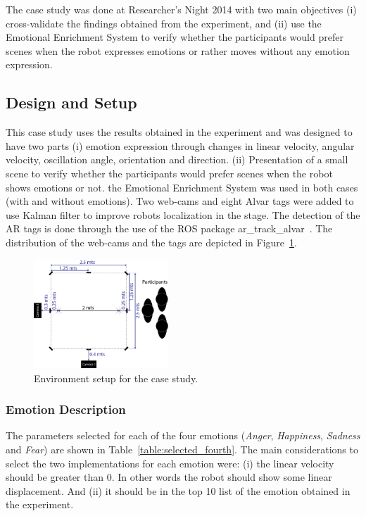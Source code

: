 The case study was done at Researcher's Night 2014 with two main objectives (i) cross-validate the findings obtained from the experiment, and (ii) use the Emotional Enrichment System to verify whether the participants would prefer scenes when the robot expresses emotions or rather moves without any emotion expression.

\subsection{Design and Setup}

This case study uses the results obtained in the experiment and was designed to have two parts (i) emotion expression through changes in linear velocity, angular velocity, oscillation angle, orientation and direction. 
(ii) Presentation of a small scene to verify whether the participants would prefer scenes when the robot shows emotions or not. the Emotional Enrichment System was used in both cases (with and without emotions). Two web-cams and eight Alvar tags were added to use Kalman filter to improve robots localization in the stage. The detection of the AR tags is done through the use of the ROS package ar\_track\_alvar~\cite{artag2015}. The distribution of the web-cams and the tags are depicted in Figure~\ref{fig:setup_fourth}. 

\begin{figure}
	\centering
	\includegraphics[width=0.45\textwidth]{./Images/FourthCase.png} 
	\caption{Environment setup for the case study.}
	\label{fig:setup_fourth}
\end{figure}

\subsubsection{Emotion Description}

The parameters selected for each of the four emotions (\textit{Anger}, \textit{Happiness}, \textit{Sadness} and \textit{Fear}) are shown in Table~\ref{table:selected_fourth}. The main considerations to select the two implementations for each emotion were: (i) the linear velocity should be greater than $0$. In other words the robot should show some linear displacement. And (ii) it should be in the top 10 list of the emotion obtained in the experiment.

